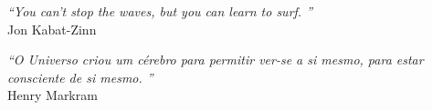 \cleardoublepage
\thispagestyle{plain}

\vspace*{5cm}

\begin{flushright}
  \textsl{``You can't stop the waves, but you can learn to surf.
  ''}\\
\vspace*{1.5cm}
    Jon Kabat-Zinn
    
\vspace*{3.5cm}    
    \textsl{``O Universo criou um cérebro para permitir ver-se a si mesmo, para estar consciente de si mesmo.
  ''}\\
  \vspace*{1.5cm}
  Henry Markram
    
\end{flushright}
